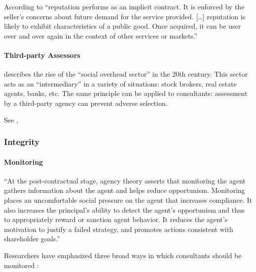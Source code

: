 \documentclass[12pt]{article}
\begin{document}
According to \citet[516]{nayyar1990} ``reputation performs as an
implicit contract. It is enforced by the seller's concerns about future
demand for the service provided. {[}\ldots{]} reputation is likely to
exhibit characteristics of a public good. Once acquired, it can be user
over and over again in the context of other services or markets.''

\hypertarget{third-party-assessors}{%
\paragraph{Third-party Assessors}\label{third-party-assessors}}

\citet[57-62]{zucker1985} describes the rise of the ``social overhead
sector'' in the 20th century. This sector acts as an ``intermediary'' in
a variety of situations: stock brokers, real estate agents, banks, etc.
The same principle can be applied to consultants: assessment by a
third-party agency can prevent adverse selection.

See \citep[ 76-77]{armbruster2006},

\hypertarget{integrity}{%
\subsubsection{Integrity}\label{integrity}}

\hypertarget{monitoring}{%
\paragraph{Monitoring}\label{monitoring}}

``At the post-contractual stage, agency theory asserts that monitoring
the agent gathers information about the agent and helps reduce
opportunism. Monitoring places an uncomfortable social pressure on the
agent that increases compliance. It also increases the principal's
ability to detect the agent's opportunism and thus to appropriately
reward or sanction agent behavior. It reduces the agent's motivation to
justify a failed strategy, and promotes actions consistent with
shareholder goals.'' \citep[ 13]{basu2011}

Researchers have emphasized three broad ways in which consultants should
be monitored \citep[ 15]{basu2011}:
\end{document}
